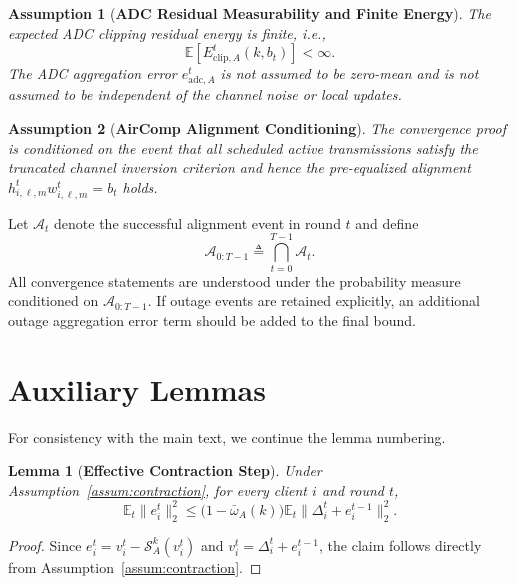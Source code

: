 \documentclass[conference]{IEEEtran}
\newtheorem{lemma}{Lemma}
\newtheorem{assumption}{Assumption}
\begin{document}
\begin{assumption}[\bf ADC Residual Measurability and Finite Energy]
    \label{assum:adc_residual}
    The expected ADC clipping residual energy is finite, i.e.,
    \begin{equation}
        \mathbb{E}\left[E_{\mathrm{clip},A}^t(k,b_t)\right]<\infty.
    \end{equation}
    The ADC aggregation error $e_{\mathrm{adc},A}^t$ is not assumed to be zero-mean and is not assumed to be independent of the channel noise or local updates.
\end{assumption}

\begin{assumption}[\bf AirComp Alignment Conditioning]
    \label{assum:no_outage}
    The convergence proof is conditioned on the event that all scheduled active transmissions satisfy the truncated channel inversion criterion and hence the pre-equalized alignment $h_{i,\ell,m}^tw_{i,\ell,m}^t=b_t$ holds.
\end{assumption}

Let $\mathcal{A}_t$ denote the successful alignment event in round $t$ and define
\begin{equation}
    \mathcal{A}_{0:T-1}\triangleq \bigcap_{t=0}^{T-1}\mathcal{A}_t.
\end{equation}
All convergence statements are understood under the probability measure conditioned on $\mathcal{A}_{0:T-1}$. If outage events are retained explicitly, an additional outage aggregation error term should be added to the final bound.

\section{Auxiliary Lemmas}

For consistency with the main text, we continue the lemma numbering.
\setcounter{lemma}{2}

\begin{lemma}[\bf Effective Contraction Step]
    \label{lemma:topk}
    Under Assumption~\ref{assum:contraction}, for every client $i$ and round $t$,
    \begin{equation}
        \mathbb{E}_t\|e_i^t\|_2^2
        \le
        \big(1-\bar{\omega}_A(k)\big)
        \mathbb{E}_t\|\Delta_i^t+e_i^{t-1}\|_2^2.
    \end{equation}
\end{lemma}
\begin{proof}
    Since $e_i^t=v_i^t-\mathcal{S}_A^k(v_i^t)$ and $v_i^t=\Delta_i^t+e_i^{t-1}$, the claim follows directly from Assumption~\ref{assum:contraction}.
\end{proof}
\end{document}
